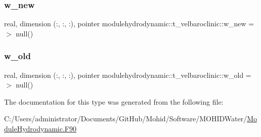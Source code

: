 \mbox{\label{structmodulehydrodynamic_1_1t__velbaroclinic_a396f18158b2462e246785900232d9763}} 
\subsubsection{\texorpdfstring{w\+\_\+new}{w\_new}}
{\footnotesize\ttfamily real, dimension (\+:, \+:, \+:), pointer modulehydrodynamic\+::t\+\_\+velbaroclinic\+::w\+\_\+new =$>$ null()\hspace{0.3cm}{\ttfamily [private]}}

\mbox{\label{structmodulehydrodynamic_1_1t__velbaroclinic_a3107d0816ae20159bcd5aeeb70360f6f}} 
\subsubsection{\texorpdfstring{w\+\_\+old}{w\_old}}
{\footnotesize\ttfamily real, dimension (\+:, \+:, \+:), pointer modulehydrodynamic\+::t\+\_\+velbaroclinic\+::w\+\_\+old =$>$ null()\hspace{0.3cm}{\ttfamily [private]}}



The documentation for this type was generated from the following file\+:\begin{DoxyCompactItemize}
\item 
C\+:/\+Users/administrator/\+Documents/\+Git\+Hub/\+Mohid/\+Software/\+M\+O\+H\+I\+D\+Water/\mbox{\hyperlink{_module_hydrodynamic_8_f90}{Module\+Hydrodynamic.\+F90}}\end{DoxyCompactItemize}
